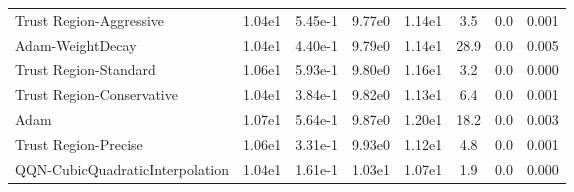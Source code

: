 \documentclass{article}
\begin{document}
\begin{table}[htbp]
{\begin{tabular}{p{2.5cm}*{7}{c}}
Trust Region-Aggressive & 1.04e1 & 5.45e-1 & 9.77e0 & 1.14e1 & 3.5 & 0.0 & 0.001 \\
Adam-WeightDecay & 1.04e1 & 4.40e-1 & 9.79e0 & 1.14e1 & 28.9 & 0.0 & 0.005 \\
Trust Region-Standard & 1.06e1 & 5.93e-1 & 9.80e0 & 1.16e1 & 3.2 & 0.0 & 0.000 \\
Trust Region-Conservative & 1.04e1 & 3.84e-1 & 9.82e0 & 1.13e1 & 6.4 & 0.0 & 0.001 \\
Adam & 1.07e1 & 5.64e-1 & 9.87e0 & 1.20e1 & 18.2 & 0.0 & 0.003 \\
Trust Region-Precise & 1.06e1 & 3.31e-1 & 9.93e0 & 1.12e1 & 4.8 & 0.0 & 0.001 \\
QQN-CubicQuadraticInterpolation & 1.04e1 & 1.61e-1 & 1.03e1 & 1.07e1 & 1.9 & 0.0 & 0.000 \\
\bottomrule
\end{tabular}
}
\end{table}
\end{document}
